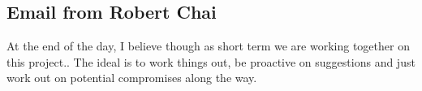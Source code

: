 \subsection{Email from Robert Chai}
\label{sec:robertsletter}
At the end of the day, I believe though as short term we are working together on this project.. The ideal is to work things out, be proactive on suggestions and just work out on potential compromises along the way.
